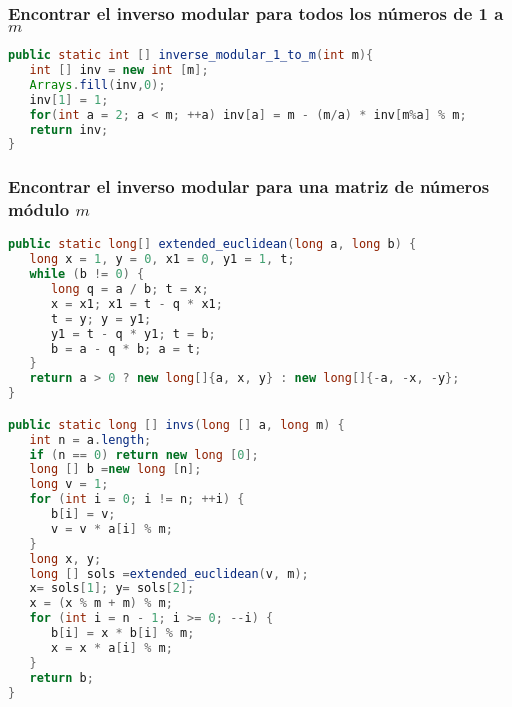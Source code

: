 \subsubsection{Encontrar el inverso modular para todos los números de 1 a $m$}
\begin{lstlisting}[language=Java]
public static int [] inverse_modular_1_to_m(int m){
   int [] inv = new int [m];
   Arrays.fill(inv,0);
   inv[1] = 1;
   for(int a = 2; a < m; ++a) inv[a] = m - (m/a) * inv[m%a] % m;
   return inv;
}
\end{lstlisting}


\subsubsection{Encontrar el inverso modular para una matriz de números módulo $m$}
\begin{lstlisting}[language=Java]
public static long[] extended_euclidean(long a, long b) {
   long x = 1, y = 0, x1 = 0, y1 = 1, t;
   while (b != 0) {
      long q = a / b; t = x;
      x = x1; x1 = t - q * x1;
      t = y; y = y1;
      y1 = t - q * y1; t = b;
      b = a - q * b; a = t;
   }
   return a > 0 ? new long[]{a, x, y} : new long[]{-a, -x, -y};
}

public static long [] invs(long [] a, long m) {
   int n = a.length;
   if (n == 0) return new long [0];
   long [] b =new long [n];
   long v = 1;
   for (int i = 0; i != n; ++i) {
      b[i] = v;
      v = v * a[i] % m;
   }
   long x, y;
   long [] sols =extended_euclidean(v, m);
   x= sols[1]; y= sols[2];
   x = (x % m + m) % m;
   for (int i = n - 1; i >= 0; --i) {
      b[i] = x * b[i] % m;
      x = x * a[i] % m;
   }
   return b;
}
\end{lstlisting}
